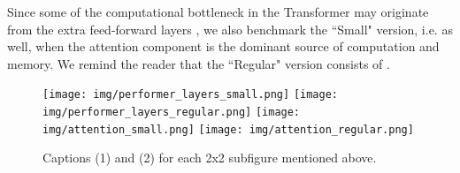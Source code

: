Since some of the computational bottleneck in the Transformer may originate from the extra feed-forward layers \citep{reformer}, we also benchmark the ``Small" version, i.e.  as well, when the attention component is the dominant source of computation and memory. We remind the reader that the ``Regular" version consists of  . 

\vspace{0.1cm}
\label{appendix:computation_costs_bidirectional}

\begin{comment}
\begin{figure}
  \texttt{[image: img/performer\_layers\_small.png]}
  \texttt{[image: img/performer\_layers\_regular.png]}
  \caption{Varying layers when using Performer. We show that our method can scale up to (but not necessarily limited to) even 20 layers.}
  \label{fig:appendix_layers}
\end{figure}


\begin{figure}
  \texttt{[image: img/attention\_small.png]}
  \texttt{[image: img/attention\_regular.png]}
  \caption{Attention time complexities when comparing standard attention (from Transformer) and FAVOR (from Performer). Note that the maximum memory size here is not reflective of the maximum memory size in an actual model (shown below), as this benchmark requires computing explicit tensors (causing memory increases) in Jax, while a model does not.}
  \label{fig:appendix_attention}
\end{figure}


\begin{figure}
  \texttt{[image: img/model\_small\_opt.png]}
  \texttt{[image: img/model\_regular\_opt.png]}
  \caption{Time complexities when comparing the Transformer and Performer models. "X" (OPT) denotes the maximum possible speedup achievable, when attention simply returns the -vector, showing that the Performer is nearly optimal. We see that the maximum possible length allowed on a V100 GPU (16GB) is  using regular dimensions.}
  \label{fig:appendix_transformer}
\end{figure}
\end{comment}


\begin{figure}[h]
  \texttt{[image: img/performer\_layers\_small.png]}
  \texttt{[image: img/performer\_layers\_regular.png]}
  \texttt{[image: img/attention\_small.png]}
  \texttt{[image: img/attention\_regular.png]}

  \caption{Captions (1) and (2) for each 2x2 subfigure mentioned above.}
  \label{fig:appendix_runtime}
\end{figure}

